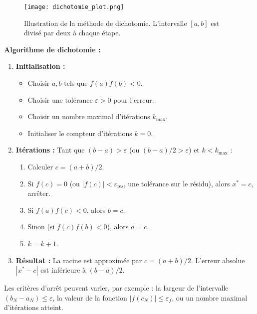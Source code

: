 \begin{figure}[H]
\centering
\texttt{[image: dichotomie\_plot.png]}
\caption{Illustration de la méthode de dichotomie. L'intervalle $[a,b]$ est divisé par deux à chaque étape.}
\label{fig:dichotomie_plot}
\end{figure}

\textbf{Algorithme de dichotomie :}
\begin{enumerate}
    \item \textbf{Initialisation :}
    \begin{itemize}
        \item Choisir $a, b$ tels que $f(a)f(b) < 0$.
        \item Choisir une tolérance $\varepsilon > 0$ pour l'erreur.
        \item Choisir un nombre maximal d'itérations $k_{\text{max}}$.
        \item Initialiser le compteur d'itérations $k=0$.
    \end{itemize}
    \item \textbf{Itérations :} Tant que $(b-a) > \varepsilon$ (ou $(b-a)/2 > \varepsilon$) et $k < k_{\text{max}}$ :
    \begin{enumerate}
        \item Calculer $c = (a+b)/2$.
        \item Si $f(c) = 0$ (ou $|f(c)| < \varepsilon_{\text{res}}$, une tolérance sur le résidu), alors $x^*=c$, arrêter.
        \item Si $f(a)f(c) < 0$, alors $b=c$.
        \item Sinon (si $f(c)f(b) < 0$), alors $a=c$.
        \item $k = k+1$.
    \end{enumerate}
    \item \textbf{Résultat :} La racine est approximée par $c = (a+b)/2$. L'erreur absolue $|x^* - c|$ est inférieure à $(b-a)/2$.
\end{enumerate}
Les critères d'arrêt peuvent varier, par exemple : la largeur de l'intervalle $(b_N-a_N) \le \varepsilon$, la valeur de la fonction $|f(c_N)| \le \varepsilon_f$, ou un nombre maximal d'itérations atteint.

